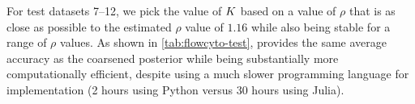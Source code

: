 
For test datasets 7--12, we pick the value of $K$ based on a value of $\rho$ that is as close as possible to the estimated $\rho$ value of $1.16$ while also being stable for a range of $\rho$ values.
As shown in \cref{tab:flowcyto-test}, \methodname provides the same average accuracy as the coarsened posterior
while being substantially more computationally efficient, despite using a much slower programming language for implementation (2 hours using Python versus 30 hours using Julia). %





